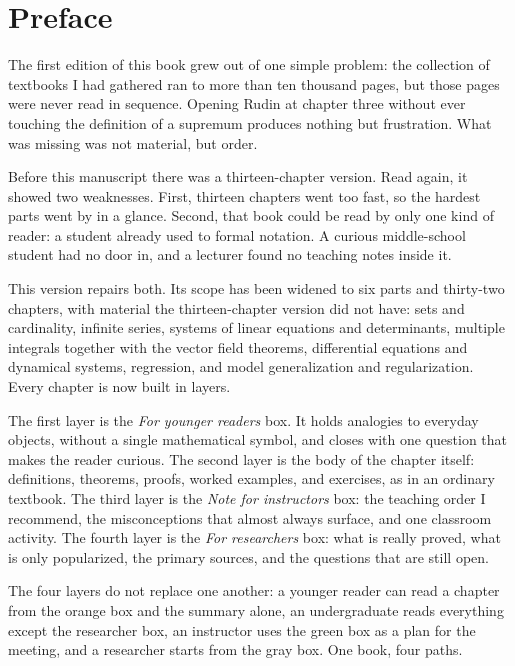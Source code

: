 \chapter*{Preface}

The first edition of this book grew out of one simple problem: the collection of
textbooks I had gathered ran to more than ten thousand pages, but those pages were
never read in sequence. Opening Rudin at chapter three without ever touching the
definition of a supremum produces nothing but frustration. What was missing was not
material, but order.

Before this manuscript there was a thirteen-chapter version. Read again, it showed two
weaknesses. First, thirteen chapters went too fast, so the hardest parts went by in a
glance. Second, that book could be read by only one kind of reader: a student already
used to formal notation. A curious middle-school student had no door in, and a lecturer
found no teaching notes inside it.

This version repairs both. Its scope has been widened to six parts and thirty-two
chapters, with material the thirteen-chapter version did not have: sets and
cardinality, infinite series, systems of linear equations and determinants, multiple
integrals together with the vector field theorems, differential equations and dynamical
systems, regression, and model generalization and regularization. Every chapter is now
built in layers.

The first layer is the \emph{For younger readers} box. It holds analogies to everyday
objects, without a single mathematical symbol, and closes with one question that makes
the reader curious. The second layer is the body of the chapter itself: definitions,
theorems, proofs, worked examples, and exercises, as in an ordinary textbook. The third
layer is the \emph{Note for instructors} box: the teaching order I recommend, the
misconceptions that almost always surface, and one classroom activity. The fourth layer
is the \emph{For researchers} box: what is really proved, what is only popularized, the
primary sources, and the questions that are still open.

The four layers do not replace one another: a younger reader can read a chapter from the
orange box and the summary alone, an undergraduate reads everything except the
researcher box, an instructor uses the green box as a plan for the meeting, and a
researcher starts from the gray box. One book, four paths.

